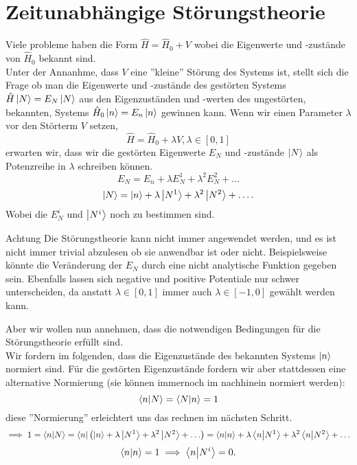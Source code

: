 \documentclass{report}
\begin{document}
\section{Zeitunabhängige Störungstheorie}
Viele probleme haben die Form $\hat{H} = \hat{H}_0 + V$ wobei die Eigenwerte und -zustände von $\hat{H}_0$ bekannt sind. \\
Unter der Annanhme, dass $V$ eine ''kleine'' Störung des Systems ist, stellt sich die Frage ob man die Eigenwerte und -zustände des gestörten Systems $\hat{H}\ket{N} = E_N \ket{N}$ aus den Eigenzuständen und -werten des ungestörten, bekannten, Systems $\hat{H}_0 \ket{n} = E_n \ket{n}$ gewinnen kann.
Wenn wir einen Parameter $\lambda$ vor den Störterm $V$ setzen, \[
	\hat{H} = \hat{H}_0 + \lambda V, \lambda \in [0,1]
\] erwarten wir, dass wir die gestörten Eigenwerte $E_N$ und -zustände $\ket{N} $ als Potenzreihe in $\lambda$ schreiben können. \[
E_N = E_n + \lambda E_N^1 + \lambda^2 E_N^2 + \ldots
\] \[
\ket{N} = \ket{n} + \lambda \ket{N^1} + \lambda^2 \ket{N^2} + \ldots
.\]  
Wobei die $E_N^i$ und $\ket{N^i} $ noch zu bestimmen sind. \\
\begin{redbox}{Achtung}
	Die Störungstheorie kann nicht immer angewendet werden, und es ist nicht immer trivial abzulesen ob sie anwendbar ist oder nicht. Beispielsweise könnte die Veränderung der $E_N$ durch eine nicht analytische Funktion gegeben sein. Ebenfalls lassen sich negative und positive Potentiale nur schwer unterscheiden, da anstatt $\lambda \in [0,1]$ immer auch $\lambda \in [-1,0]$ gewählt werden kann.
\end{redbox}
Aber wir wollen nun annehmen, dass die notwendigen Bedingungen für die Störungstheorie erfüllt sind. \\
Wir fordern im folgenden, dass die Eigenzustände des bekannten Systems $\ket{n} $ normiert sind. Für die gestörten Eigenzustände fordern wir aber stattdessen eine alternative Normierung (sie können immernoch im nachhinein normiert werden): \[
\bra{n} \ket{N} = \bra{N} \ket{n} = 1
\] diese ''Normierung'' erleichtert uns das rechnen im nächsten Schritt. \[
\implies 1=\bra{n} \ket{N} = \bra{n} \left( \ket{n} + \lambda \ket{N^1} + \lambda^2 \ket{N^2} + \ldots \right) 
= \bra{n} \ket{n} + \lambda \bra{n} \ket{N^1} + \lambda^2 \bra{n} \ket{N^2} + \ldots 
\] \[
\bra{n} \ket{n} = 1\implies \bra{n} \ket{N^i} = 0
.\]   
\end{document}
